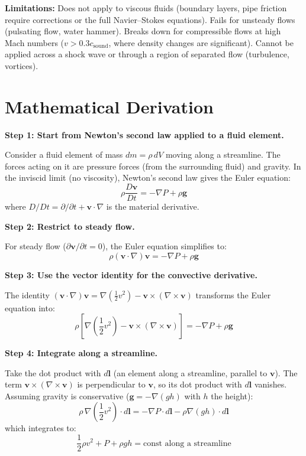 \textbf{Limitations:} Does not apply to viscous fluids (boundary layers, pipe friction require corrections or the full Navier--Stokes equations). Fails for unsteady flows (pulsating flow, water hammer). Breaks down for compressible flows at high Mach numbers ($v > 0.3c_{\text{sound}}$, where density changes are significant). Cannot be applied across a shock wave or through a region of separated flow (turbulence, vortices).


\section*{Mathematical Derivation}

\textbf{Step 1: Start from Newton's second law applied to a fluid element.}

Consider a fluid element of mass $dm = \rho\,dV$ moving along a streamline. The forces acting on it are pressure forces (from the surrounding fluid) and gravity. In the inviscid limit (no viscosity), Newton's second law gives the Euler equation:
\begin{equation}
\rho\frac{D\mathbf{v}}{Dt} = -\nabla P + \rho\mathbf{g}
\end{equation}
where $D/Dt = \partial/\partial t + \mathbf{v}\cdot\nabla$ is the material derivative.

\textbf{Step 2: Restrict to steady flow.}

For steady flow ($\partial\mathbf{v}/\partial t = 0$), the Euler equation simplifies to:
\begin{equation}
\rho(\mathbf{v}\cdot\nabla)\mathbf{v} = -\nabla P + \rho\mathbf{g}
\end{equation}

\textbf{Step 3: Use the vector identity for the convective derivative.}

The identity $(\mathbf{v}\cdot\nabla)\mathbf{v} = \nabla(\frac{1}{2}v^2) - \mathbf{v}\times(\nabla\times\mathbf{v})$ transforms the Euler equation into:
\begin{equation}
\rho\left[\nabla\left(\frac{1}{2}v^2\right) - \mathbf{v}\times(\nabla\times\mathbf{v})\right] = -\nabla P + \rho\mathbf{g}
\end{equation}

\textbf{Step 4: Integrate along a streamline.}

Take the dot product with $d\mathbf{l}$ (an element along a streamline, parallel to $\mathbf{v}$). The term $\mathbf{v}\times(\nabla\times\mathbf{v})$ is perpendicular to $\mathbf{v}$, so its dot product with $d\mathbf{l}$ vanishes. Assuming gravity is conservative ($\mathbf{g} = -\nabla(gh)$ with $h$ the height):
\begin{equation}
\rho\,\nabla\left(\frac{1}{2}v^2\right)\cdot d\mathbf{l} = -\nabla P\cdot d\mathbf{l} - \rho\nabla(gh)\cdot d\mathbf{l}
\end{equation}
which integrates to:
\begin{equation}
\frac{1}{2}\rho v^2 + P + \rho gh = \text{const along a streamline}
\end{equation}

